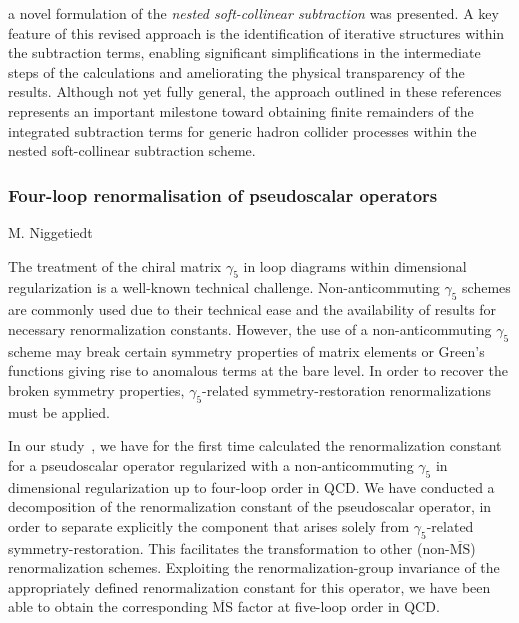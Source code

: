 \documentclass{FBR_Bericht_2025}
\begin{document}
\begin{refsection}
a novel formulation of the \emph{nested soft-collinear subtraction} was presented. 
A key feature of this revised approach is the identification of iterative structures within the subtraction terms,
enabling significant simplifications in the intermediate steps of the calculations and ameliorating the physical transparency of the results. 
Although not yet fully general, the approach outlined in these references represents an important milestone toward obtaining finite remainders of the integrated subtraction terms for generic hadron collider processes within the nested soft-collinear subtraction scheme.


%
\subsubsection{Four-loop renormalisation of pseudoscalar operators}
\begin{Namen}
M. Niggetiedt
\end{Namen}
%
The treatment of the chiral matrix $\gamma_5$ in loop diagrams within dimensional regularization is a well-known technical challenge. Non-anticommuting $\gamma_5$ schemes are commonly used due to their technical ease and the availability of results for necessary renormalization constants. However, the use of a non-anticommuting $\gamma_5$ scheme may break certain symmetry properties of matrix elements or Green's functions giving rise to anomalous terms at the bare level. In order to recover the broken symmetry properties, $\gamma_5$-related symmetry-restoration renormalizations must be applied. 

In our study~\cite{Chen:2024cvu}, we have for the first time calculated the renormalization constant for a pseudoscalar operator regularized with a non-anticommuting $\gamma_5$ in dimensional regularization up to four-loop order in QCD. We have conducted a decomposition of the renormalization constant of the pseudoscalar operator, in order to separate explicitly the component that arises solely from $\gamma_5$-related symmetry-restoration. This facilitates the transformation to other (non-$\overline{\mathrm{MS}}$) renormalization schemes. Exploiting the renormalization-group invariance of the appropriately defined renormalization constant for this operator, we have been able to obtain the corresponding $\overline{\mathrm{MS}}$ factor at five-loop order in QCD. 
%

\end{refsection}
\end{document}
